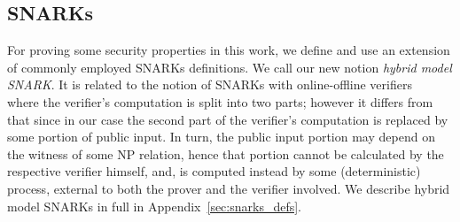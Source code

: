 \subsection{SNARKs}
\label{sec:short_snarks_defs}
\noindent For proving some security properties in this work, we define and use an extension of commonly employed SNARKs definitions. We call our new notion \emph{hybrid model SNARK}. It is related to the notion of SNARKs with online-offline verifiers~\cite{HP_paper} where the verifier's computation 
is split into two parts; however it differs from that since in our case the second part of the verifier's computation is replaced by some portion of public input. 
In turn, the public input portion may depend on the witness of some NP relation, hence that portion cannot be calculated by the respective verifier himself, and, is computed instead by some (deterministic) process, external to both the prover and the verifier involved. We describe hybrid model SNARKs in full in Appendix~\ref{sec:snarks_defs}. %




